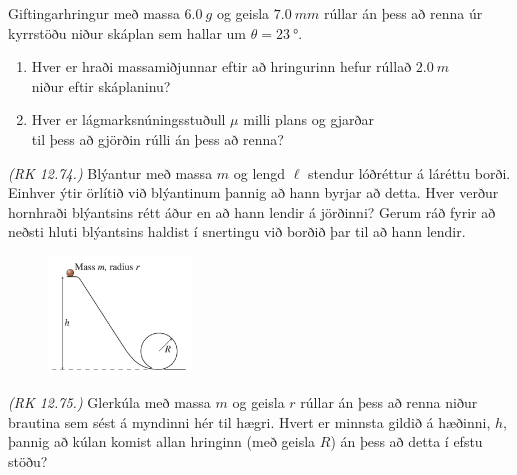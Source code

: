\ifdefined \wholebook \else\documentclass[oneside]{book}\usepackage{EdlBook}\graphicspath{{figures/}}
\begin{document}
\begin{enumerate}[label = \textbf{Dæmi \thechapter.\arabic*.}]
\begin{minipage}{\linewidth}
\item Giftingarhringur með massa $\SI{6,0}{g}$ og geisla $\SI{7,0}{mm}$ rúllar án þess að renna úr kyrrstöðu niður skáplan sem hallar um $\theta = \SI{23}{\degree}$.
\end{minipage}

\begin{enumerate}[label = \textbf{(\alph*)}]
    \item Hver er hraði massamiðjunnar eftir að hringurinn hefur rúllað $\SI{2.0}{m}$ \\ niður eftir skáplaninu?
    
    \item Hver er lágmarksnúningsstuðull $\mu$ milli plans og gjarðar \\ til þess að gjörðin rúlli án þess að renna?
\end{enumerate}

\item \textit{(RK 12.74.)} Blýantur með massa $m$ og lengd $\ell$ stendur lóðréttur á láréttu borði. Einhver ýtir örlítið við blýantinum þannig að hann byrjar að detta. Hver verður hornhraði blýantsins rétt áður en að hann lendir á jörðinni? Gerum ráð fyrir að neðsti hluti blýantsins haldist í snertingu við borðið þar til að hann lendir.

\vspace{0.5cm}


\begin{minipage}{\linewidth}

\begin{figure}
\vspace{-0.75cm}
\includegraphics[width=1.5in]{images/usapho.png}
\end{figure}


\item \textit{(RK 12.75.)} Glerkúla með massa $m$ og geisla $r$ rúllar án þess að renna niður brautina sem sést á myndinni hér til hægri. Hvert er minnsta gildið á hæðinni, $h$, þannig að kúlan komist allan hringinn (með geisla $R$) án þess að detta í efstu stöðu?
\end{minipage}




\end{enumerate}
\end{document}
